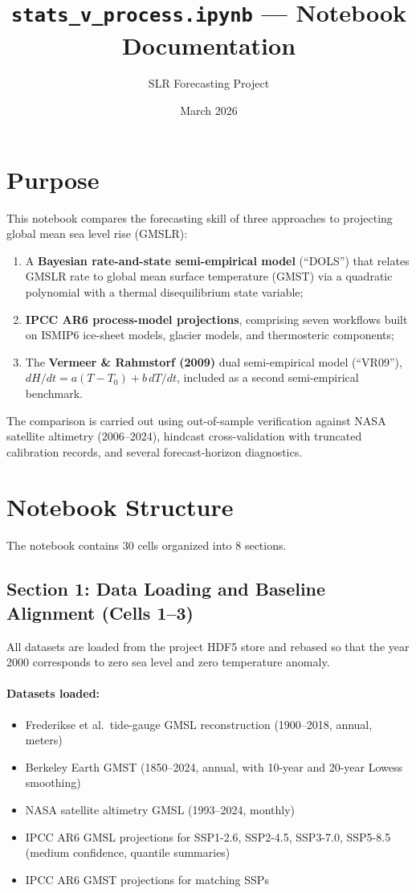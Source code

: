 \documentclass[11pt]{article}
\title{\texttt{stats\_v\_process.ipynb} --- Notebook Documentation}
\author{SLR Forecasting Project}
\date{March 2026}
\begin{document}
\maketitle

\section{Purpose}

This notebook compares the forecasting skill of three approaches to projecting global mean sea level rise (GMSLR):
\begin{enumerate}[noitemsep]
    \item A \textbf{Bayesian rate-and-state semi-empirical model} (``DOLS'') that relates GMSLR rate to global mean surface temperature (GMST) via a quadratic polynomial with a thermal disequilibrium state variable;
    \item \textbf{IPCC AR6 process-model projections}, comprising seven workflows built on ISMIP6 ice-sheet models, glacier models, and thermosteric components;
    \item The \textbf{Vermeer \& Rahmstorf (2009)} dual semi-empirical model (``VR09''), $dH/dt = a(T - T_0) + b\,dT/dt$, included as a second semi-empirical benchmark.
\end{enumerate}
The comparison is carried out using out-of-sample verification against NASA satellite altimetry (2006--2024), hindcast cross-validation with truncated calibration records, and several forecast-horizon diagnostics.

\section{Notebook Structure}

The notebook contains 30 cells organized into 8 sections.

\subsection{Section 1: Data Loading and Baseline Alignment (Cells 1--3)}

All datasets are loaded from the project HDF5 store and rebased so that the year 2000 corresponds to zero sea level and zero temperature anomaly.

\paragraph{Datasets loaded:}
\begin{itemize}[noitemsep]
    \item Frederikse et al.\ tide-gauge GMSL reconstruction (1900--2018, annual, meters)
    \item Berkeley Earth GMST (1850--2024, annual, with 10-year and 20-year Lowess smoothing)
    \item NASA satellite altimetry GMSL (1993--2024, monthly)
    \item IPCC AR6 GMSL projections for SSP1-2.6, SSP2-4.5, SSP3-7.0, SSP5-8.5 (medium confidence, quantile summaries)
    \item IPCC AR6 GMST projections for matching SSPs
\end{itemize}
\end{document}
